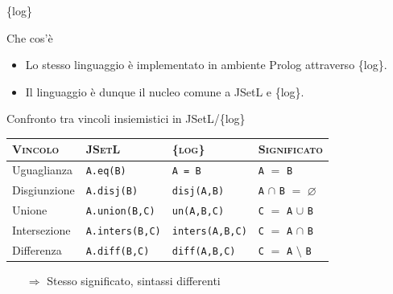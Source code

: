 \documentclass{beamer}
\begin{document}
\begin{frame}{\{log\}}
  		
        {
        	\begin{block}{Che cos'\`e}
        	\begin{itemize}
        	\setlength\itemsep{2em}
        	\item Lo stesso linguaggio  \`e implementato in ambiente Prolog attraverso \{log\}.
        	\item Il linguaggio  \`e dunque il nucleo comune a JSetL e \{log\}.
			\end{itemize}        
        	\end{block}	
        }
        
\end{frame}

\begin{frame}{Confronto tra vincoli insiemistici in JSetL/\{log\}}

\begin{table}[]
\begin{tabular}{|l|l|l|l|}
\hline
\textsc{Vincolo }     & \textsc{JSetL}          & \textsc{\{log\}}           & \textsc{Significato}\\ \hline
Uguaglianza  & \texttt{A.eq(B)}        & \texttt{A = B}           & \texttt{A} $=$ \texttt{B}                        \\ \hline
Disgiunzione & \texttt{A.disj(B)}     & \texttt{disj(A,B)}      & \texttt{A} $\cap$ \texttt{B} $=$ $\varnothing$   \\ \hline
Unione       & \texttt{A.union(B,C)}  & \texttt{un(A,B,C)}  & \texttt{C} $=$ \texttt{A} $\cup$ \texttt{B}      \\ \hline
Intersezione & \texttt{A.inters(B,C)} & \texttt{inters(A,B,C)} & \texttt{C} $=$ \texttt{A} $\cap$ \texttt{B}      \\ \hline
Differenza   & \texttt{A.diff(B,C)}   & \texttt{diff(A,B,C)}   & \texttt{C} $=$ \texttt{A} $\setminus$ \texttt{B} \\ \hline
\end{tabular}
\end{table}


\vspace*{20px}

\begin{itemize}

\item[$\Longrightarrow$] Stesso significato, sintassi differenti\\
\end{itemize}


\end{frame}
\end{document}
